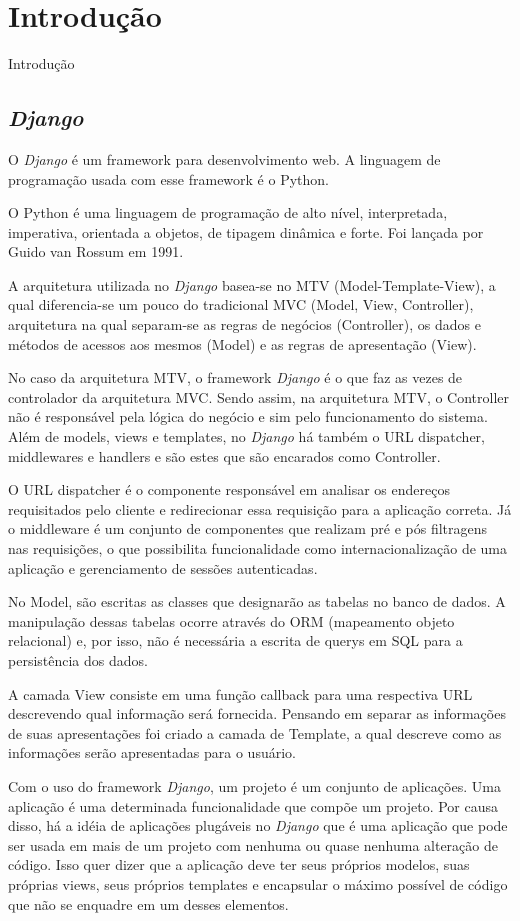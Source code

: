 \chapter{Introdução}
Introdução

\section{\textit{Django}}
O \textit{Django} é um framework para desenvolvimento web. A linguagem de programação usada com esse framework é o Python.

O Python é uma linguagem de programação de alto nível, interpretada, imperativa, orientada a objetos, de tipagem dinâmica e forte. Foi lançada por Guido van Rossum em 1991.

A arquitetura utilizada no \textit{Django} basea-se no MTV (Model-Template-View), a qual diferencia-se um pouco do tradicional MVC (Model, View, Controller), arquitetura na qual separam-se as regras de negócios (Controller), os dados e métodos de acessos aos mesmos (Model) e as regras de apresentação (View).

No caso da arquitetura MTV, o framework \textit{Django} é o que faz as vezes de controlador da arquitetura MVC. Sendo assim, na arquitetura MTV, o Controller não é responsável pela lógica do negócio e sim pelo funcionamento do sistema. Além de models, views e templates, no \textit{Django} há também o URL dispatcher, middlewares e handlers e são estes que são encarados como Controller.

O URL dispatcher é o componente responsável em analisar os endereços requisitados pelo cliente e redirecionar essa requisição para a aplicação correta. Já o middleware é um conjunto de componentes que realizam pré e pós filtragens nas requisições, o que possibilita funcionalidade como internacionalização de uma aplicação e gerenciamento de sessões autenticadas.

No Model, são escritas as classes que designarão as tabelas no banco de dados. A manipulação dessas tabelas ocorre através do ORM (mapeamento objeto relacional) e, por isso, não é necessária a escrita de querys em SQL para a persistência dos dados.

A camada View consiste em uma função callback para uma respectiva URL descrevendo qual informação será fornecida. Pensando em separar as informações de suas apresentações foi criado a camada de Template, a qual descreve como as informações serão apresentadas para o usuário.

Com o uso do framework \textit{Django}, um projeto é um conjunto de aplicações. Uma aplicação é uma determinada funcionalidade que compõe um projeto. Por causa disso, há a idéia de aplicações plugáveis no \textit{Django} que é uma aplicação que pode ser usada em mais de um projeto com nenhuma ou quase nenhuma alteração de código. Isso quer dizer que a aplicação deve ter seus próprios modelos, suas próprias views, seus próprios templates e encapsular o máximo possível de código que não se enquadre em um desses elementos.

